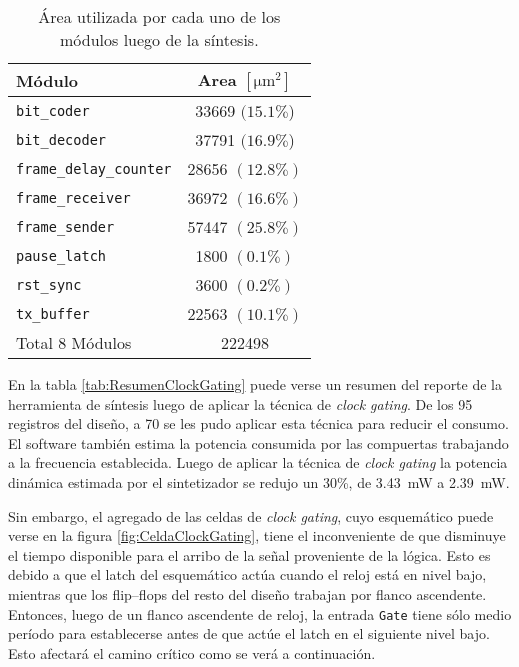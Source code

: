 \begin{table}
	\centering
	\begin{tabu}{lc}
		\toprule
		Módulo & Area \(\left[\si{\micro\meter\squared}\right]\) \\  
		\midrule
		\lstinline{bit_coder}              & 33669 \((15.1\%\)) \\
		\lstinline{bit_decoder}            & 37791 \((16.9\%\)) \\
		\lstinline{frame_delay_counter}    & 28656 \((12.8\%)\) \\
		\lstinline{frame_receiver}         & 36972 \((16.6\%)\) \\
		\lstinline{frame_sender}           & 57447 \((25.8\%)\) \\
		\lstinline{pause_latch}            & 1800  \((0.1\%)\) \\
		\lstinline{rst_sync}     & 3600  \((0.2\%)\) \\
		\lstinline{tx_buffer}              & 22563 \((10.1\%)\) \\
		\midrule
		Total 8 Módulos        &         222498\\
		\bottomrule
	\end{tabu}
	
	\caption{Área utilizada por cada uno de los módulos luego de la 
	síntesis.}
	
	\label{tab:AreaDigital}
\end{table}

En la tabla \ref{tab:ResumenClockGating} puede verse un resumen del 
reporte de la herramienta de síntesis luego de aplicar la técnica 
de \emph{clock gating}. De los 95 registros del diseño, a 70 
se les pudo aplicar esta técnica para reducir el consumo. El software 
también estima la potencia consumida por las compuertas trabajando a 
la frecuencia establecida. Luego de aplicar la técnica de \emph{clock 
gating} la potencia dinámica estimada por el sintetizador se redujo 
un 30\%, de \SI{3.43}{\milli\watt} a \SI{2.39}{\milli\watt}.

Sin embargo, el agregado de las celdas de \emph{clock gating}, cuyo 
esquemático puede verse en la figura \ref{fig:CeldaClockGating}, tiene 
el inconveniente de que disminuye el tiempo disponible para el arribo 
de la señal proveniente de la lógica. Esto es debido a que el latch 
del esquemático actúa cuando el reloj está en nivel bajo, mientras que 
los flip--flops del resto del diseño trabajan por flanco ascendente. 
Entonces, luego de un flanco ascendente de reloj, la entrada 
\lstinline{Gate} tiene sólo medio período para establecerse antes de 
que actúe el latch en el siguiente nivel bajo. Esto afectará el 
camino crítico como se verá a continuación.


